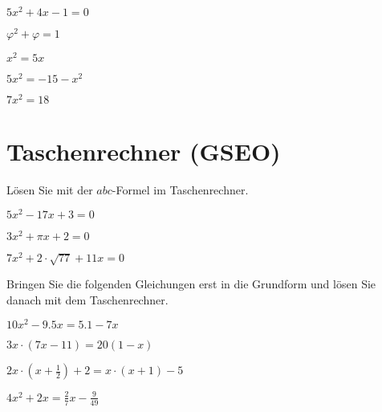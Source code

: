 \begin{bbwAufgabenBlock}
\item $ 5x^2 + 4x - 1 = 0$

\item $ \varphi^2 + \varphi = 1$

\item $ x^2= 5x$

\item $ 5x^2 = -15 - x^2 $
\LoesungsBlock{$\lx= \left\{   \right\}$}

\item $ 7x^2 = 18$


\end{bbwAufgabenBlock}
\newpage

\section{Taschenrechner (GSEO)}
Lösen Sie mit der $abc$-Formel im Taschenrechner.


\begin{bbwAufgabenBlock}
\item $ 5x^2-17x+3= 0$

\item $ 3x^2+\pi x + 2= 0$
\LoesungsBlock{$\lx= \left\{  \right\}$}

\item $ 7x^2 + 2\cdot{}\sqrt{77} + 11x= 0$

Bringen Sie die folgenden Gleichungen erst in die Grundform und lösen
Sie danach mit dem Taschenrechner.

\item $ 10x^2 -9.5x = 5.1 - 7x $

\item $ 3x\cdot{}(7x-11)= 20(1-x)$

\item $ 2x\cdot{}(x+\frac12) + 2 = x\cdot{}(x+1) -5 $
\LoesungsBlock{$\lx= \left\{   \right\}$}

\item $ 4x^2 + 2x = \frac27 x - \frac9{49} $


\end{bbwAufgabenBlock}
\newpage

